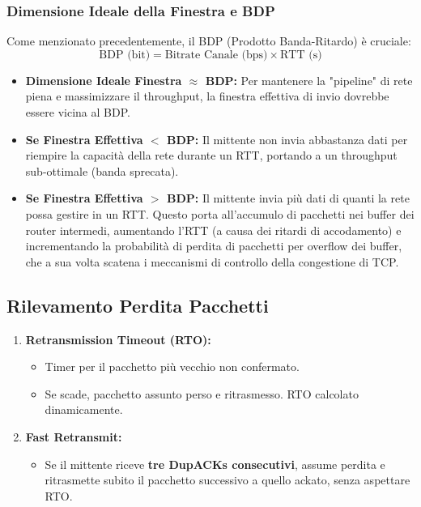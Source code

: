 \subsubsection{Dimensione Ideale della Finestra e BDP}
Come menzionato precedentemente, il BDP (Prodotto Banda-Ritardo) è cruciale:
\[ \text{BDP (bit)} = \text{Bitrate Canale (bps)} \times \text{RTT (s)} \]
\begin{itemize}
    \item \textbf{Dimensione Ideale Finestra $\approx$ BDP:} Per mantenere la "pipeline" di rete piena e massimizzare il throughput, la finestra effettiva di invio dovrebbe essere vicina al BDP.
    \item \textbf{Se Finestra Effettiva $<$ BDP:} Il mittente non invia abbastanza dati per riempire la capacità della rete durante un RTT, portando a un throughput sub-ottimale (banda sprecata).
    \item \textbf{Se Finestra Effettiva $>$ BDP:} Il mittente invia più dati di quanti la rete possa gestire in un RTT. Questo porta all'accumulo di pacchetti nei buffer dei router intermedi, aumentando l'RTT (a causa dei ritardi di accodamento) e incrementando la probabilità di perdita di pacchetti per overflow dei buffer, che a sua volta scatena i meccanismi di controllo della congestione di TCP.
\end{itemize}

\subsection{Rilevamento Perdita Pacchetti}
\begin{enumerate}
    \item \textbf{Retransmission Timeout (RTO):}
    \begin{itemize}
        \item Timer per il pacchetto più vecchio non confermato.
        \item Se scade, pacchetto assunto perso e ritrasmesso. RTO calcolato dinamicamente.
    \end{itemize}
    \item \textbf{Fast Retransmit:}
    \begin{itemize}
        \item Se il mittente riceve \textbf{tre DupACKs consecutivi}, assume perdita e ritrasmette subito il pacchetto successivo a quello ackato, senza aspettare RTO.
    \end{itemize}
\end{enumerate}

